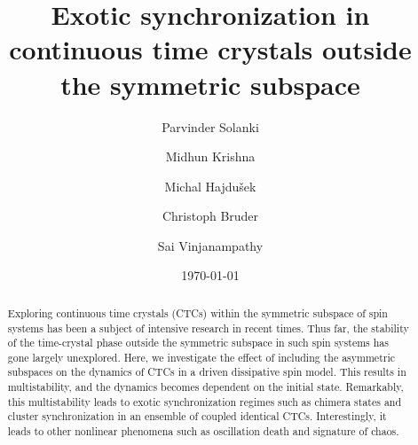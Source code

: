 \documentclass[pra,aps,twocolumn,superscriptaddress,notitlepage]{revtex4-1}
\begin{document}
	
	
	\title{Exotic synchronization in continuous time crystals outside the symmetric subspace}
	
	\author{Parvinder Solanki}
	
	\author{Midhun Krishna}
	
	
	\author{Michal Hajdu\v{s}ek}
	\author{Christoph Bruder}
	\author{Sai Vinjanampathy}
	\date{\today}
	
	
	\begin{abstract}
		Exploring continuous time crystals (CTCs) within the symmetric subspace of spin systems has been a subject of intensive research in recent times. Thus far, the stability of the time-crystal phase outside the symmetric subspace in such spin systems has gone largely unexplored. Here, we investigate the effect of including the asymmetric subspaces on the dynamics of CTCs in a driven dissipative spin model. This results in multistability, and the dynamics becomes dependent on the initial state.  Remarkably, this multistability leads to exotic synchronization regimes such as chimera states and cluster synchronization in an ensemble of coupled identical CTCs. Interestingly, it leads to other nonlinear phenomena such as oscillation death and signature of chaos.
		
	\end{abstract} 
	\maketitle
	
\end{document}
